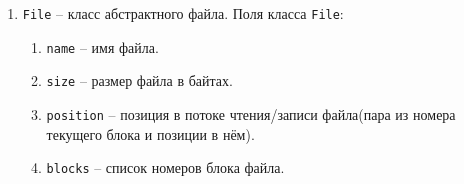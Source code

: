 \begin{enumerate}
\begin{enumerate}
		\begin{enumerate}
			\item \texttt{name} -- название файла;
			\item \texttt{size} -- размер файла в байтах. Для каталогов равно 0;
			\item \texttt{create-date} -- дата создания файла, если нет в конкретной файловой системе, то равно \texttt{nil};
			\item \texttt{create-time} -- время создания файла, если нет в конкретной файловой системе, то равно \texttt{nil};
			\item \texttt{modify-date} -- дата последнего изменения файла, если нет в конкретной файловой системе, то равно \texttt{nil};
			\item \texttt{modify-time} -- время последнего изменения файла, если нет в конкретной файловой системе, то равно \texttt{nil};
			\item \texttt{access-date} -- дата последнего доступа файла, если нет в конкретной файловой системе, то равно \texttt{nil};
			\item \texttt{access-date} -- время последнего изменения файла, если нет в конкретной файловой системе, то равно \texttt{nil};
			\item \texttt{isdir} -- флаг, показывающий, является ли файл каталогом;
			\item другие атрибуты, которые зависят от конкретной файловой системы.
		\end{enumerate}
		
		\item \texttt{new-block} -- добавить новый блок к файлу. Аргументы: \texttt{file-object}(объект файла, к которому необходимо добавить новый блок). Возвращает \texttt{nil}.
		
	\end{enumerate}
	
	\item \texttt{File} -- класс абстрактного файла. Поля класса \texttt{File}:
	
	\begin{enumerate}
		\item \texttt{name} -- имя файла.
		\item \texttt{size} -- размер файла в байтах.
		\item \texttt{position} -- позиция в потоке чтения/записи файла(пара из номера текущего блока и позиции в нём).
		\item \texttt{blocks} -- список номеров блока файла.
	\end{enumerate}
	

\end{enumerate}
